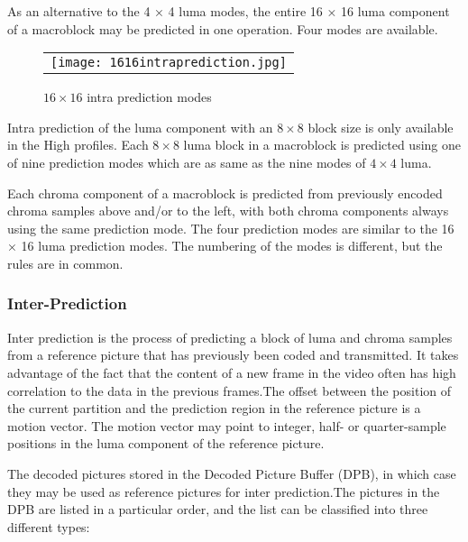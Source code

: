\documentclass[../main.tex]{subfiles}
\begin{document}
As an alternative to the 4 × 4 luma modes, the entire 16 × 16 luma component
of a macroblock may be predicted in one operation. Four modes are available.

\begin{figure} [ht]
   \begin{center}
   \begin{tabular}{c} %
   \texttt{[image: 1616intraprediction.jpg]}
   \end{tabular}
   \end{center}
   \caption[16x16predmodes] 
   { \label{fig:16x16predmodes} 
$16 \times 16$ intra prediction modes }
   \end{figure}     %
   
Intra prediction of the luma component with an $8 \times 8$ block size is only available in the High
profiles. Each $8 \times 8$ luma block in a macroblock is predicted using one of nine
prediction modes which are as same as the nine modes of $4 \times 4$ luma.
   
Each chroma component of a macroblock is predicted from previously encoded chroma
samples above and/or to the left, with both chroma components always using the same
prediction mode. The four prediction modes are similar to the 16 × 16 luma prediction
modes. The numbering of the modes is different, but the rules are in common.
  
\subsubsection{ Inter-Prediction }

Inter prediction is the process of predicting
a block of luma and chroma samples from a reference picture that has
previously been coded and transmitted. It
takes advantage of the fact that the content of a new frame in
the video often has high correlation to the data in the
previous frames.The offset between the position of the current partition and the prediction
region in the reference picture is a motion vector. The motion vector may point to integer,
half- or quarter-sample positions in the luma component of the reference picture. 

The decoded pictures stored in the Decoded
Picture Buffer (DPB), in which case they may be used as
reference pictures for inter prediction.The pictures in the DPB are listed in a particular order, and
the list can be classified into three different types:
\end{document}
